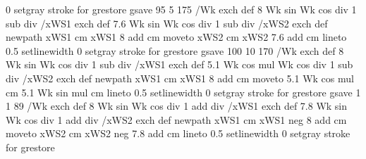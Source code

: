 {{{                       0 setgray
                       stroke
                   } for
  grestore
  gsave
     95 5 175 { /Wk exch def
                        {8 Wk sin Wk cos div 1 sub div} /xWS1 exch def
                        {7.6 Wk sin Wk cos div 1 sub div} /xWS2 exch def
                        newpath
                        xWS1 cm xWS1 8 add cm moveto
                        xWS2 cm xWS2 7.6 add cm
                        lineto
                        0.5 setlinewidth
                        0 setgray
                        stroke
                      } for
  grestore
  gsave
    100 10 170 { /Wk exch def
                          {8 Wk sin Wk cos div 1 sub div} /xWS1 exch def
                          {5.1 Wk cos mul  Wk cos div 1 sub div} /xWS2 exch def
                          newpath
                          xWS1 cm xWS1 8 add cm moveto
                         5.1 Wk cos mul cm 5.1 Wk sin mul cm
                         lineto
                         0.5 setlinewidth
                         0 setgray
                        stroke
                     } for
  grestore
  gsave
     1 1 89 { /Wk exch def
                   {8 Wk sin Wk cos div 1 add div} /xWS1 exch def
                   {7.8 Wk sin Wk cos div 1 add div} /xWS2 exch def
                   newpath
                   xWS1 cm xWS1 neg 8 add cm moveto
                   xWS2 cm xWS2 neg 7.8 add cm
                  lineto
                  0.5 setlinewidth
                  0 setgray
                  stroke
               } for
  grestore
}}
